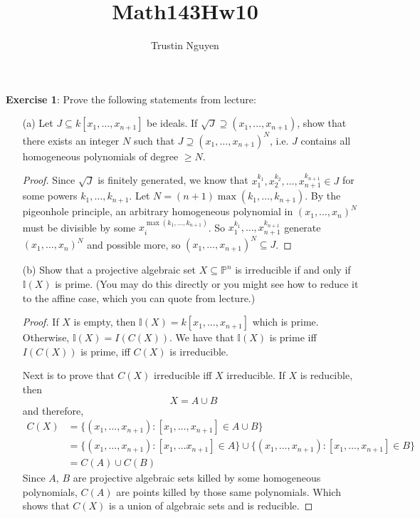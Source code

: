 \documentclass{article}
\title{Math143Hw10}
\author{Trustin Nguyen}
\begin{document}
    \maketitle

\reversemarginpar

\textbf{Exercise 1}: Prove the following statements from lecture:
    \begin{itemize}
        \item [(a)] Let $J \subseteq k[x_{1}, \ldots, x_{n + 1}]$ be ideals. If $\sqrt{J} \supseteq (x_{1}, \ldots, x_{n + 1})$, show that there exists an integer $N$ such that $J \supseteq (x_{1}, \ldots, x_{n + 1})^{N}$, i.e. $J$ contains all homogeneous polynomials of degree $\geq N$.
            \begin{proof}
                Since $\sqrt{J}$ is finitely generated, we know that $x_{1}^{k_{1}}, x_{2}^{k_{2}}, \ldots, x_{n + 1}^{k_{n + 1}} \in J$ for some powers $k_{1}, \ldots, k_{n + 1}$. Let $N = (n + 1)\max(k_{1}, \ldots, k_{n + 1})$. By the pigeonhole principle, an arbitrary homogeneous polynomial in $(x_{1}, \ldots, x_{n})^{N}$ must be divisible by some $x_{i}^{\max(k_{1}, \ldots, k_{n + 1})}$. So $x_{1}^{k_{1}}, \ldots, x_{n + 1}^{k_{n + 1}}$ generate $(x_{1}, \ldots, x_{n})^{N}$ and possible more, so $(x_{1}, \ldots, x_{n + 1})^{N} \subseteq J$.
            \end{proof}

        \item [(b)] Show that a projective algebraic set $X \subseteq \mathbb{P}^{n}$ is irreducible if and only if $\mathbb{I}(X)$ is prime. (You may do this directly or you might see how to reduce it to the affine case, which you can quote from lecture.) 
            \begin{proof}
                If $X$ is empty, then $\mathbb{I}(X) = k[x_{1}, \ldots, x_{n + 1}]$ which is prime. Otherwise, $\mathbb{I}(X) = I(C(X))$. We have that $\mathbb{I}(X)$ is prime iff $I(C(X))$ is prime, iff $C(X)$ is irreducible. 

                Next is to prove that $C(X)$ irreducible iff $X$ irreducible. If $X$ is reducible, then 
                    \begin{equation*}
                        X = A \cup B
                    \end{equation*}
                and therefore, 
                    \begin{align*}
                        C(X) &= \{(x_{1}, \ldots, x_{n + 1}) : [x_{1}, \ldots, x_{n + 1}] \in A \cup B\} \\
                             &= \{(x_{1}, \ldots, x_{n + 1}) : [x_{1}, \ldots x_{n + 1}] \in A\} \cup \{(x_{1}, \ldots, x_{n + 1}) : [x_{1}, \ldots, x_{n + 1}] \in B\} \\
                             &= C(A) \cup C(B)
                    \end{align*}
                Since $A$, $B$ are projective algebraic sets killed by some homogeneous polynomials, $C(A)$ are points killed by those same polynomials. Which shows that $C(X)$ is a union of algebraic sets and is reducible.


\end{proof}
\end{itemize}
\end{document}
